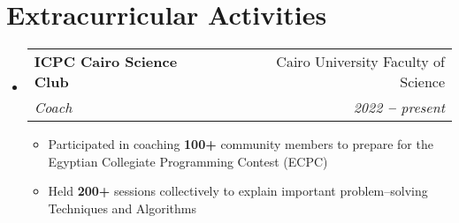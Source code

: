 \documentclass[a4paper,12pt]{article}
\makeatletter
\newcommand{\resumeItem}[1]{
  \item\small{
    {#1 \vspace{-2pt}}
  }
}
\newcommand{\resumeSubheading}[4]{
  \vspace{-2pt}\item
    \begin{tabular*}{0.97\textwidth}[t]{l@{\extracolsep{\fill}}r}
      \textbf{#1} & #2 \\
      \textit{\small#3} & \textit{\small #4} \\
    \end{tabular*}\vspace{-7pt}
}
\newcommand{\resumeSubHeadingListStart}{\begin{itemize}[leftmargin=0.15in, label={}]}
\newcommand{\resumeSubHeadingListEnd}{\end{itemize}}
\newcommand{\resumeItemListStart}{\begin{itemize}}
\newcommand{\resumeItemListEnd}{\end{itemize}\vspace{-5pt}}
\makeatother
\begin{document}



\section{Extracurricular Activities}

\resumeSubHeadingListStart

\resumeSubheading{ICPC Cairo Science Club \href{https://www.facebook.com/sci.cpc}{\faLink}}{Cairo University Faculty of Science}
{Coach} {2022 \textbf{--} present}
\resumeItemListStart
\resumeItem{Participated in coaching \textbf{100+} community members to prepare for the Egyptian Collegiate Programming Contest (ECPC)}
\resumeItem{Held \textbf{200+} sessions collectively to explain important problem–solving Techniques and Algorithms}
\resumeItemListEnd

\resumeSubHeadingListEnd
\end{document}

